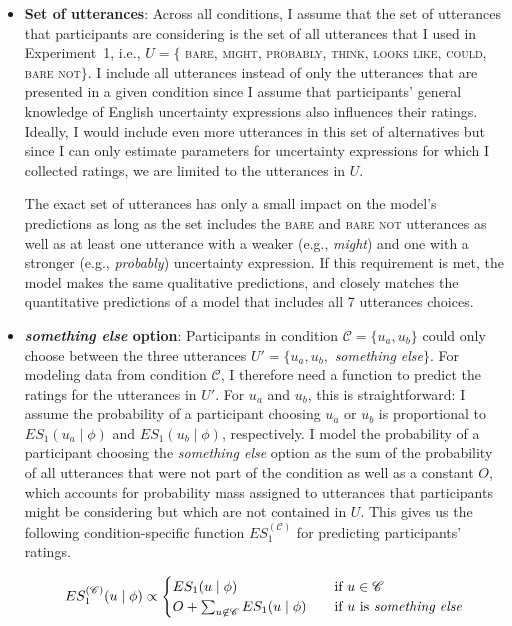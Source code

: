 \begin{itemize}
\item \textbf{Set of utterances}: Across all conditions, I assume that the set of utterances that participants are 
considering is the set of all utterances that I used in Experiment~1, i.e., $U= \{$ \textsc{bare}, \textsc{might}, 
\textsc{probably}, \textsc{think}, \textsc{looks like}, \textsc{could}, \textsc{bare not}$\}$. I include all utterances 
instead of only the utterances that are presented in a given condition since I assume that participants' general 
knowledge of English uncertainty expressions also influences their ratings. Ideally, I would include even more 
utterances in this set of alternatives but since I can only estimate parameters for uncertainty expressions for 
which I collected ratings, we are limited to the utterances in $U$. 

The exact set of utterances has only a small impact on the model's predictions as long as the set includes the \textsc{bare}
and \textsc{bare not} utterances as well as at least one utterance with a weaker 
(e.g., \textit{might}) and one with a stronger (e.g., \textit{probably})
uncertainty expression. If this requirement is met, the model makes the same qualitative predictions, 
and closely matches the quantitative predictions of a model that includes all 7 utterances choices.

\item \textbf{\textit{something else} option}: Participants in condition $\mathscr{C} = \{u_a, u_b\}$ 
could only choose between the three utterances $U' = \{u_a, u_b,$ \textit{something else}$\}$.
For modeling data from condition $\mathscr{C}$, I therefore need a function to predict the ratings 
for the utterances in $U'$. For $u_a$ and $u_b$, this is straightforward: I assume the probability 
of a participant choosing $u_a$ or $u_b$
is proportional to $ES_1(u_a \mid \phi)$ and $ES_1(u_b \mid \phi)$, respectively. 
I model the probability of a participant choosing the \textit{something else} option as the sum 
of the probability of all utterances that were not part of the condition as well as a constant $O$, 
which accounts for probability mass assigned to utterances that participants might be 
considering but which are not contained in $U$. This gives us the following condition-specific 
function $ES_1^{(\mathscr{C})}$ for predicting participants' ratings.

$$
ES_1^{(\mathscr{C})}(u \mid \phi) \propto 
    \begin{cases}
      ES_1(u \mid \phi) & \quad\mbox{if } u  \in \mathscr{C}\\
       O + \sum_{u \not \in \mathscr{C}} ES_1(u \mid \phi) & \quad \mbox{if $u$ is \textit{something else}} \\
   \end{cases}
$$


\end{itemize}
